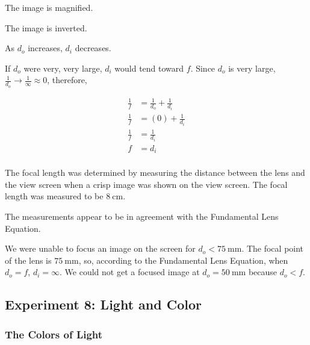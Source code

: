 \documentclass[12pt]{article}
\begin{document}
The image is magnified.

\subsubsubsection{}

The image is inverted.

\subsubsubsection{}

As \(d_o\) increases, \(d_i\) decreases.

\subsubsubsection{}

If \(d_o\) were very, very large, \(d_i\) would tend toward \(f\). Since \(d_o\)
is very large, \(\frac{1}{d_o} \rightarrow \frac{1}{\infty} \approx 0\), therefore,

\begin{align*}
  \frac{1}{f} &= \frac{1}{d_o} + \frac{1}{d_i} \\
  \frac{1}{f} &= (0) + \frac{1}{d_i} \\
  \frac{1}{f} &= \frac{1}{d_i} \\
  f &= d_i \\
\end{align*} 

\subsubsubsection{}

The focal length was determined by measuring the distance between the lens and
the view screen when a crisp image was shown on the view screen. The focal
length was measured to be \(\SI{8}{\centi\meter}\).

\subsubsubsection{}

The measurements appear to be in agreement with the Fundamental Lens Equation.

\subsubsubsection{}

We were unable to focus an image on the screen for \(d_o <
\SI{75}{\milli\meter}\). The focal point of the lens is
\(\SI{75}{\milli\meter}\), so, according to the Fundamental Lens Equation, when
\(d_o = f\), \(d_i = \infty\). We could not get a focused image at \(d_o =
\SI{50}{\milli\meter}\) because \(d_o < f\). 



\subsection{Experiment 8: Light and Color}

\subsubsection{The Colors of Light}

\subsubsubsection{}
\end{document}
